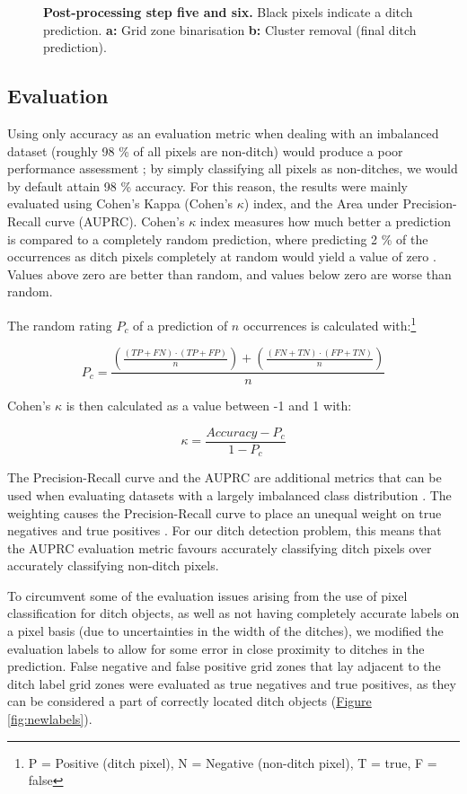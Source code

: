 \documentclass[11pt, review]{elsarticle} %
\begin{document}
\begin{figure} [!htb]
    \caption{\textbf{Post-processing step five and six.} Black pixels indicate a ditch prediction. \textbf{a: }Grid zone binarisation \textbf{b: }Cluster removal (final ditch prediction).}
    \label{fig:postprocessing3}
\end{figure}

\subsection{Evaluation} \label{evaluation}

Using only accuracy as an evaluation metric when dealing with an imbalanced dataset (roughly 98 \% of all pixels are non-ditch) would produce a poor performance assessment \citep{balanced}; by simply classifying all pixels as non-ditches, we would by default attain 98 \% accuracy. For this reason, the results were mainly evaluated using Cohen's Kappa (Cohen's $\kappa$) index, and the Area under Precision-Recall curve (AUPRC). Cohen's $\kappa$ index measures how much better a prediction is compared to a completely random prediction, where predicting 2 \% of the occurrences as ditch pixels completely at random would yield a value of zero \citep{kappa123}. Values above zero are better than random, and values below zero are worse than random.

The random rating $P_c$ of a prediction of $n$ occurrences is calculated with:\footnote{ P = Positive (ditch pixel), N = Negative (non-ditch pixel), T = true, F = false}

$$
P_c = \frac{\left(\frac{(TP + FN) \cdot (TP + FP)}{n}\right) + \left(\frac{(FN + TN) \cdot (FP + TN)}{n}\right)}{n}
$$


Cohen's $\kappa$ is then calculated as a value between -1 and 1 with:

$$\kappa = \frac{Accuracy - P_c}{1 - P_c}$$

The Precision-Recall curve and the AUPRC  are additional metrics that can be used when evaluating datasets with a largely imbalanced class distribution \citep{precision_recall_curve}. The weighting causes the Precision-Recall curve to place an unequal weight on true negatives and true positives \citep{precision_recall_curve}. For our ditch detection problem, this means that the AUPRC evaluation metric favours accurately classifying ditch pixels over accurately classifying non-ditch pixels.

To circumvent some of the evaluation issues arising from the use of pixel classification for ditch objects, as well as not having completely accurate labels on a pixel basis (due to uncertainties in the width of the ditches), we modified the evaluation labels to allow for some error in close proximity to ditches in the prediction. False negative and false positive grid zones that lay adjacent to the ditch label grid zones were evaluated as true negatives and true positives, as they can be considered a part of correctly located ditch objects (\hyperref[fig:newlabels]{Figure} \ref{fig:newlabels}).
\end{document}
